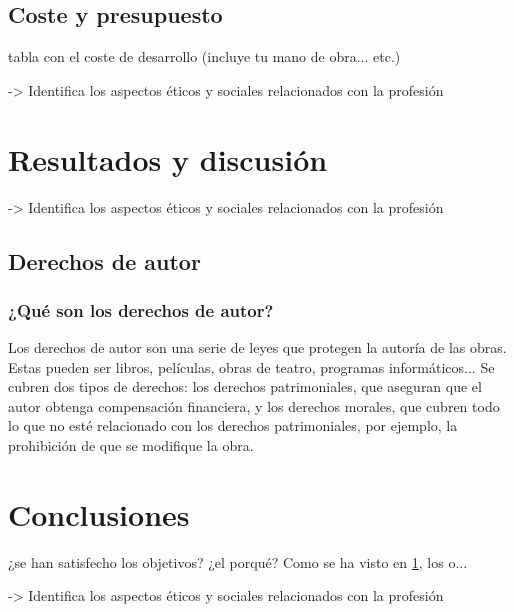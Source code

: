 \documentclass{article}
\begin{document}
 \subsection{Coste y presupuesto}
  
  tabla con el coste de desarrollo (incluye tu mano de obra... etc.)
  
->  Identifica los aspectos éticos y sociales relacionados con la profesión

 
\section{Resultados y discusión}\label{sec:ResultadosDisc}

-> Identifica los aspectos éticos y sociales relacionados con la profesión

\subsection{Derechos de autor}
\subsubsection{¿Qué son los derechos de autor?}
Los derechos de autor son una serie de leyes que protegen la autoría de las obras. Estas pueden ser libros, películas, obras de teatro, programas informáticos...\newline
Se cubren dos tipos de derechos: los derechos patrimoniales, que aseguran que el autor obtenga compensación financiera, y los derechos morales, que cubren todo lo que no esté relacionado con los derechos patrimoniales, por ejemplo, la prohibición de que se modifique la obra.\cite{derechos_ompi}

\section{Conclusiones}

 ¿se han satisfecho los objetivos? ¿el porqué? Como se ha visto en \ref{sec:ResultadosDisc}, los o...
 
-> Identifica los aspectos éticos y sociales relacionados con la profesión




\end{document}
